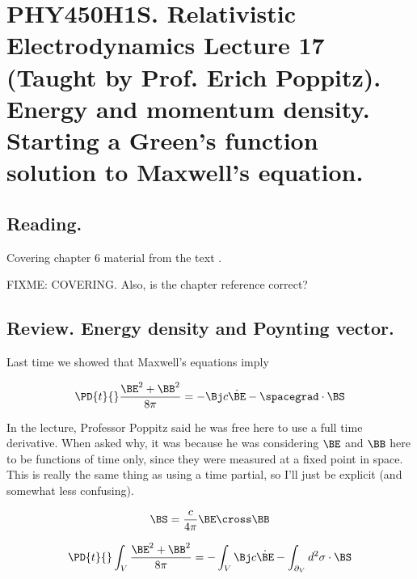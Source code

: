 
%

\chapter{PHY450H1S.  Relativistic Electrodynamics Lecture 17 (Taught by Prof. Erich Poppitz).  Energy and momentum density.  Starting a Green's function solution to Maxwell's equation.}
\label{chap:relativisticElectrodynamicsL17}
{}
\date{Mar 8, 2011}

\beginArtNoToc

\section{Reading.}

Covering chapter 6 material from the text \cite{landau1980classical}.

FIXME: COVERING.  Also, is the chapter reference correct?

\section{Review.  Energy density and Poynting vector.}

Last time we showed that Maxwell's equations imply

\begin{equation}\label{eqn:relativisticElectrodynamicsL17:n}
\PD{t}{} \frac{\BE^2 + \BB^2 }{8 \pi} = -\Bj c\dot \BE - \spacegrad \cdot \BS
\end{equation}

In the lecture, Professor Poppitz said he was free here to use a full time derivative.  When asked why, it was because he was considering $\BE$ and $\BB$ here to be functions of time only, since they were measured at a fixed point in space.  This is really the same thing as using a time partial, so I'll just be explicit (and somewhat less confusing).

\begin{equation}\label{eqn:relativisticElectrodynamicsL17:n}
\BS = \frac{c}{4 \pi} \BE \cross \BB
\end{equation}

\begin{equation}\label{eqn:relativisticElectrodynamicsL17:n}
\PD{t}{} \int_V \frac{\BE^2 + \BB^2 }{8 \pi} = - \int_V \Bj c\dot \BE - \int_{\partial_V} d^2 \sigma \cdot \BS
\end{equation}

